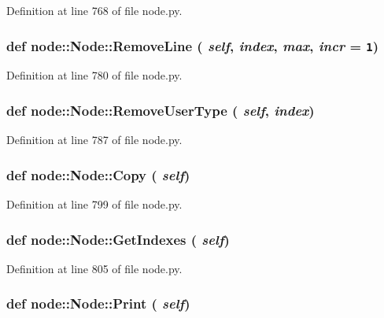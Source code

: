 Definition at line 768 of file node.py.\hypertarget{classnode_1_1Node_2288996b16df9715706a7414c3e77561}{
\subsubsection[RemoveLine]{\setlength{\rightskip}{0pt plus 5cm}def node::Node::Remove\-Line ( {\em self},  {\em index},  {\em max},  {\em incr} = {\tt 1})}}
\label{classnode_1_1Node_2288996b16df9715706a7414c3e77561}




Definition at line 780 of file node.py.\hypertarget{classnode_1_1Node_f08c254fb41e4e3ef53d9025be396421}{
\subsubsection[RemoveUserType]{\setlength{\rightskip}{0pt plus 5cm}def node::Node::Remove\-User\-Type ( {\em self},  {\em index})}}
\label{classnode_1_1Node_f08c254fb41e4e3ef53d9025be396421}




Definition at line 787 of file node.py.\hypertarget{classnode_1_1Node_22f871d92675c482ffe86543ff743937}{
\subsubsection[Copy]{\setlength{\rightskip}{0pt plus 5cm}def node::Node::Copy ( {\em self})}}
\label{classnode_1_1Node_22f871d92675c482ffe86543ff743937}




Definition at line 799 of file node.py.\hypertarget{classnode_1_1Node_2c13cc6017f11586d2d468dfc13eea3f}{
\subsubsection[GetIndexes]{\setlength{\rightskip}{0pt plus 5cm}def node::Node::Get\-Indexes ( {\em self})}}
\label{classnode_1_1Node_2c13cc6017f11586d2d468dfc13eea3f}




Definition at line 805 of file node.py.\hypertarget{classnode_1_1Node_eea414ed028d0c7394b2a3d2e074dc6c}{
\subsubsection[Print]{\setlength{\rightskip}{0pt plus 5cm}def node::Node::Print ( {\em self})}}
\label{classnode_1_1Node_eea414ed028d0c7394b2a3d2e074dc6c}




